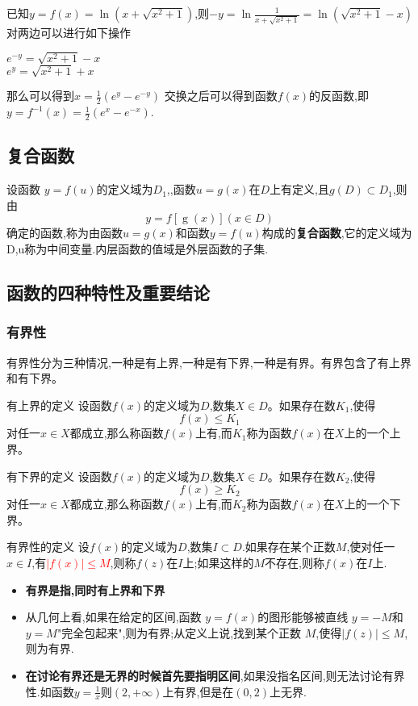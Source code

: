 \documentclass[12pt, a4paper, oneside, UTF8]{ctexbook}  %
\begin{document}
\begin{solution}
    已知$y=f(x)=\ln(x+\sqrt{x^2+1})$,则$-y=\ln \frac{1}{x+\sqrt{x^2+1}}=\ln(\sqrt{x^2+1}-x)$\\
    对两边可以进行如下操作
    \begin{center}
        $e^{-y}=\sqrt{x^2+1}-x$\\
        $e^{y}=\sqrt{x^2+1}+x$\\
    \end{center}
    那么可以得到$x=\frac{1}{2}(e^y-e^{-y})$
    交换之后可以得到函数$f(x)$的反函数,即
    $y=f^{-1}(x)=\frac{1}{2}(e^x-e^{-x})$.
\end{solution}
\subsection{复合函数}
设函数 $y=f(u)$的定义域为$D_1$,,函数$u=g(x)$在$D$上有定义,且$g(D) \subset D_1$,则由
$$
    y=f[\operatorname{g}(x)](x{\in}D)
$$
确定的函数,称为由函数$u=g(x)$和函数$y=f(u)$构成的\textbf{复合函数},它的定义域为D,u称为中间变量.内层函数的值域是外层函数的子集.
\subsection{函数的四种特性及重要结论}
\subsubsection{有界性}
有界性分为三种情况,一种是有上界,一种是有下界,一种是有界。有界包含了有上界和有下界。
\begin{defn}{有上界的定义}{}
    设函数$f(x)$的定义域为$D$,数集$X \in D$。如果存在数$K_1$,使得
    $$
        f(x) \le K_1
    $$
    对任一$x \in X$都成立,那么称函数$f(x)$上有,而$K_1$称为函数$f(x)$在$X$上的一个上界。
\end{defn}
\begin{defn}{有下界的定义}{}
    设函数$f(x)$的定义域为$D$,数集$X \in D$。如果存在数$K_2$,使得
    $$
        f(x) \geq  K_2
    $$
    对任一$x \in X$都成立,那么称函数$f(x)$上有,而$K_2$称为函数$f(x)$在$X$上的一个下界。
\end{defn}
\begin{defn}{有界性的定义}{}
    设$f(x)$的定义域为$D$,数集$I \subset D$.如果存在某个正数$M$,使对任一$x \in I$,有\textcolor{red}{$|f(x)| \leqslant M$},则称$f(z)$在$I$上;如果这样的$M$不存在,则称$f(x)$在$I$上.
\end{defn}
\begin{itemize}
    \item \textbf{有界是指,同时有上界和下界}
    \item 从几何上看,如果在给定的区间,函数 $y=f(x)$的图形能够被直线 $y=-M$和 $y=M$"完全包起来",则为有界;从定义上说,找到某个正数 $M$,使得$|f(z)| \leqslant M$,则为有界.
    \item \textbf{在讨论有界还是无界的时候首先要指明区间},如果没指名区间,则无法讨论有界性.如函数$y=\frac{1}{x}$则$(2,+\infty)$上有界,但是在$(0,2)$上无界.
\end{itemize}
\end{document}
